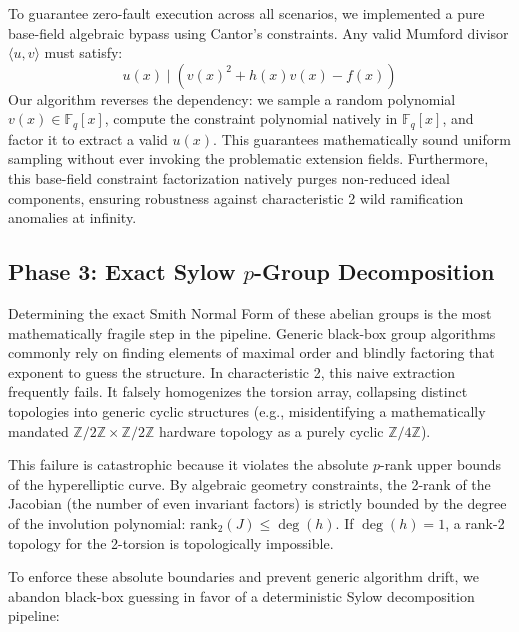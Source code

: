 \documentclass[letterpaper, 11pt]{article}
\begin{document}
To guarantee zero-fault execution across all scenarios, we implemented a pure base-field algebraic bypass using Cantor's constraints. Any valid Mumford divisor $\langle u, v \rangle$ must satisfy:
\begin{equation}
    u(x) \mid \left( v(x)^2 + h(x)v(x) - f(x) \right)
\end{equation}
Our algorithm reverses the dependency: we sample a random polynomial $v(x) \in \mathbb{F}_q[x]$, compute the constraint polynomial natively in $\mathbb{F}_q[x]$, and factor it to extract a valid $u(x)$. This guarantees mathematically sound uniform sampling without ever invoking the problematic extension fields. Furthermore, this base-field constraint factorization natively purges non-reduced ideal components, ensuring robustness against characteristic 2 wild ramification anomalies at infinity.

\subsection{Phase 3: Exact Sylow \texorpdfstring{$p$}{p}-Group Decomposition}
Determining the exact Smith Normal Form of these abelian groups is the most mathematically fragile step in the pipeline. Generic black-box group algorithms commonly rely on finding elements of maximal order and blindly factoring that exponent to guess the structure. In characteristic 2, this naive extraction frequently fails. It falsely homogenizes the torsion array, collapsing distinct topologies into generic cyclic structures (e.g., misidentifying a mathematically mandated $\mathbb{Z}/2\mathbb{Z} \times \mathbb{Z}/2\mathbb{Z}$ hardware topology as a purely cyclic $\mathbb{Z}/4\mathbb{Z}$). 

This failure is catastrophic because it violates the absolute $p$-rank upper bounds of the hyperelliptic curve. By algebraic geometry constraints, the 2-rank of the Jacobian (the number of even invariant factors) is strictly bounded by the degree of the involution polynomial: $\text{rank}_2(J) \le \deg(h)$. If $\deg(h) = 1$, a rank-2 topology for the 2-torsion is topologically impossible.

To enforce these absolute boundaries and prevent generic algorithm drift, we abandon black-box guessing in favor of a deterministic Sylow decomposition pipeline:
\end{document}
